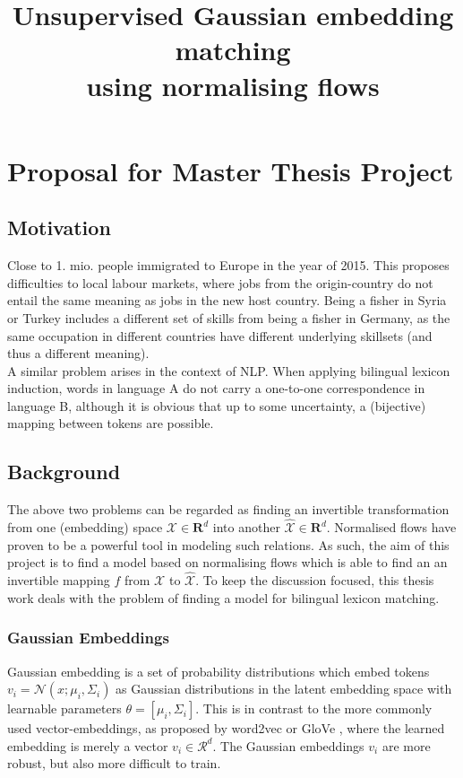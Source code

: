 \documentclass{NSF}
\begin{document}

\pagestyle{headings}
\markright{}

\title{Unsupervised Gaussian embedding matching \\ using normalising flows}
\section{Proposal for Master Thesis Project}

\subsection{Motivation}

Close to 1. mio. people immigrated to Europe in the year of 2015.
This proposes difficulties to local labour markets, where jobs from the origin-country do not entail the same meaning as jobs in the new host country.
Being a fisher in Syria or Turkey includes a different set of skills from being a fisher in Germany, as the same occupation in different countries have different underlying skillsets (and thus a different meaning). \\
A similar problem arises in the context of NLP.
When applying bilingual lexicon induction, words in language A do not carry a one-to-one correspondence in language B, although it is obvious that up to some uncertainty, a (bijective) mapping between tokens are possible.

\subsection{Background}

The above two problems can be regarded as finding an invertible transformation from one (embedding) space $\mathcal{X} \in \mathbf{R}^d$ into another $\mathcal{\hat{X}} \in \mathbf{R}^d$.
Normalised flows have proven to be a powerful tool in modeling such relations.
As such, the aim of this project is to find a model based on normalising flows which is able to find an an invertible mapping $f$ from $\mathcal{X}$ to $\mathcal{\hat{X}}$.
To keep the discussion focused, this thesis work deals with the problem of finding a model for bilingual lexicon matching.

\subsubsection{Gaussian Embeddings}
Gaussian embedding \cite{gaussian_embedding} is a set of probability distributions which embed tokens $ v_i = \mathcal{N}(x; \mu_i, \Sigma_i) $ as Gaussian distributions in the latent embedding space with learnable parameters $\theta = [\mu_i, \Sigma_i]$.
This is in contrast to the more commonly used vector-embeddings, as proposed by word2vec \cite{wordvec} or GloVe \cite{pennington2014glove}, where the learned embedding is merely a vector $v_i \in \mathcal{R}^d$.
The Gaussian embeddings $v_i$ are more robust, but also more difficult to train.
\end{document}
